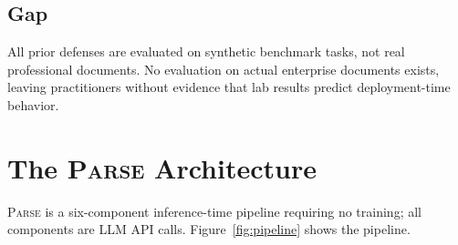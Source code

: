 \documentclass[11pt]{article}
\newcommand{\parse}{\textsc{Parse}\xspace}
\begin{document}
\subsection{Gap}

All prior defenses are evaluated on synthetic benchmark tasks, not
real professional documents.
No evaluation on actual enterprise documents exists, leaving
practitioners without evidence that lab results predict
deployment-time behavior.

\section{The \parse Architecture}

\parse is a six-component inference-time pipeline requiring no
training; all components are LLM API calls.
Figure~\ref{fig:pipeline} shows the pipeline.
\end{document}
